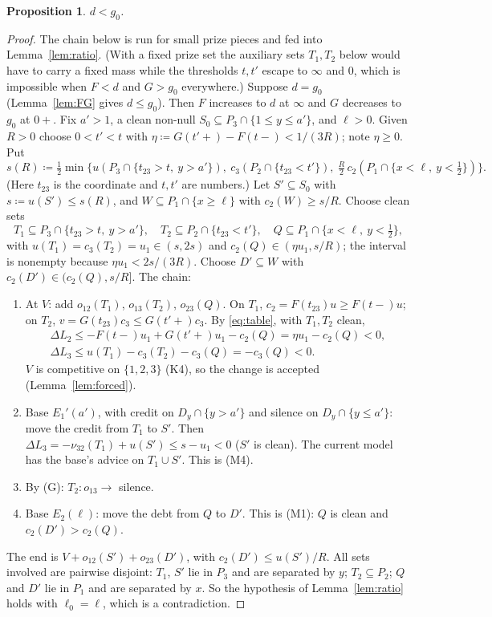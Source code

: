 \documentclass[11pt]{article}
\newtheorem{proposition}[theorem]{Proposition}
\theoremstyle{definition}\newtheorem{definition}[theorem]{Definition}
\theoremstyle{remark}\newtheorem{remark}[theorem]{Remark}
\begin{document}
\begin{proposition}\label{prop:dg}
$d<g_0$.
\end{proposition}
\begin{proof}
The chain below is run for small prize pieces and fed into
Lemma~\ref{lem:ratio}. (With a fixed prize set the auxiliary sets $T_1,T_2$
below would have to carry a fixed mass while the thresholds $t,t'$ escape to
$\infty$ and $0$, which is impossible when $F<d$ and $G>g_0$ everywhere.)
Suppose $d=g_0$ (Lemma~\ref{lem:FG} gives $d\le
g_0$). Then $F$ increases to $d$ at $\infty$ and $G$ decreases to $g_0$ at
$0+$. Fix $a'>1$, a clean non-null $S_0\subseteq P_3\cap\{1\le y\le
a'\}$, and $\ell>0$. Given $R>0$ choose $0<t'<t$ with
$\eta\coloneqq G(t'+)-F(t-)<1/(3R)$; note $\eta\ge0$. Put
\[
 s(R)\coloneqq\tfrac12\min\bigl\{u(P_3\cap\{t_{23}>t,\ y>a'\}),\
 c_3(P_2\cap\{t_{23}<t'\}),\ \tfrac R2\,c_2(P_1\cap\{x<\ell,\ y<\tfrac12\})
 \bigr\}.
\]
(Here $t_{23}$ is the coordinate and $t,t'$ are numbers.) Let $S'\subseteq
S_0$ with $s\coloneqq u(S')\le s(R)$, and $W\subseteq P_1\cap\{x\ge\ell\}$
with $c_2(W)\ge s/R$. Choose clean sets
\[
 T_1\subseteq P_3\cap\{t_{23}>t,\ y>a'\},\quad
 T_2\subseteq P_2\cap\{t_{23}<t'\},\quad
 Q\subseteq P_1\cap\{x<\ell,\ y<\tfrac12\},
\]
with $u(T_1)=c_3(T_2)=u_1\in(s,2s)$ and $c_2(Q)\in(\eta u_1,s/R)$; the
interval is nonempty because $\eta u_1<2s/(3R)$. Choose $D'\subseteq W$ with
$c_2(D')\in(c_2(Q),s/R]$. The chain:
\begin{enumerate}[label=\arabic*.,leftmargin=*,itemsep=2pt]
\item At $V$: add $o_{12}(T_1)$, $o_{13}(T_2)$, $o_{23}(Q)$. On $T_1$,
$c_2=F(t_{23})u\ge F(t-)u$; on $T_2$, $v=G(t_{23})c_3\le G(t'+)c_3$. By
\eqref{eq:table}, with $T_1,T_2$ clean,
\begin{gather*}
 \Delta L_2\le-F(t-)u_1+G(t'+)u_1-c_2(Q)=\eta u_1-c_2(Q)<0,\\
 \Delta L_3\le u(T_1)-c_3(T_2)-c_3(Q)=-c_3(Q)<0.
\end{gather*}
$V$ is competitive on $\{1,2,3\}$ (K4), so the change is accepted
(Lemma~\ref{lem:forced}).
\item Base $E_1'(a')$, with credit on $D_y\cap\{y>a'\}$ and silence on
$D_y\cap\{y\le a'\}$: move the credit from $T_1$ to $S'$. Then $\Delta
L_3=-\nu_{32}(T_1)+u(S')\le s-u_1<0$ ($S'$ is clean). The current model has
the base's advice on $T_1\cup S'$. This is (M4).
\item By (G): $T_2\colon o_{13}\to$ silence.
\item Base $E_2(\ell)$: move the debt from $Q$ to $D'$. This is (M1): $Q$ is
clean and $c_2(D')>c_2(Q)$.
\end{enumerate}
The end is $V+o_{12}(S')+o_{23}(D')$, with $c_2(D')\le u(S')/R$. All sets
involved are pairwise disjoint: $T_1$, $S'$ lie in $P_3$ and are separated
by $y$; $T_2\subseteq P_2$; $Q$ and $D'$ lie in $P_1$ and are separated by
$x$. So the hypothesis of Lemma~\ref{lem:ratio} holds with $\ell_0=\ell$,
which is a contradiction.
\end{proof}
\end{document}
